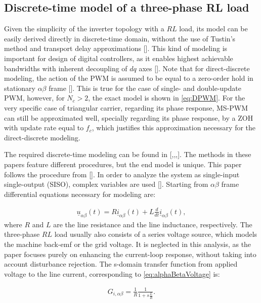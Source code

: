 \documentclass[journal]{IEEEtran}
\begin{document}
\subsection{Discrete-time model of a three-phase RL load}

Given the simplicity of the inverter topology with a $RL$ load, its model can be easily derived directly in discrete-time domain, without the use of Tustin's method and transport delay approximations []. This kind of modeling is important for design of digital controllers, as it enables highest achievable bandwidths with inherent decoupling of $dq$ axes []. 
Note that for direct-discrete modeling, the action of the PWM is assumed to be equal to a zero-order hold in stationary $\alpha \beta$ frame []. This is true for the case of single- and double-update PWM, however, for $N_c>2$, the exact model is shown in \ref{eq:DPWM}. For the very specific case of triangular carrier, regarding its phase response, MS-PWM can still be approximated well, specially regarding its phase response, by a ZOH with update rate equal to $f_c$, which justifies this approximation necessary for the direct-discrete modeling.

The required discrete-time modeling can be found in [,,,]. The methods in these papers feature different procedures, but the end model is unique. This paper follows the procedure from [].
In order to analyze the system as single-input single-output (SISO), complex variables are used []. 
Starting from $\alpha \beta$ frame differential equations necessary for modeling are:

\begin{equation}
\begin{aligned}
\underline{u}_{\alpha \beta} (t) = R \underline{i}_{\alpha \beta} (t) + L \frac{d}{dt} \underline{i}_{\alpha \beta} (t),
\label{eq:alphaBetaVoltage} 
\end{aligned}    
\end{equation}
where $R$ and $L$ are the line resistance and the line inductance, respectively. The three-phase $RL$ load usually also consists of a series voltage source, which models the machine back-emf or the grid voltage. It is neglected in this analysis, as the paper focuses purely on enhancing the current-loop response, without taking into account disturbance rejection.
The s-domain transfer function from applied voltage to the line current, corresponding to \ref{eq:alphaBetaVoltage} is:

\begin{equation}
\begin{aligned}
G_{i,\alpha \beta} = \frac{1}{R} \frac{1}{1 + s \frac{L}{R}}.
\label{eq:sDomainAlphaBeta} 
\end{aligned}    
\end{equation}
\end{document}
